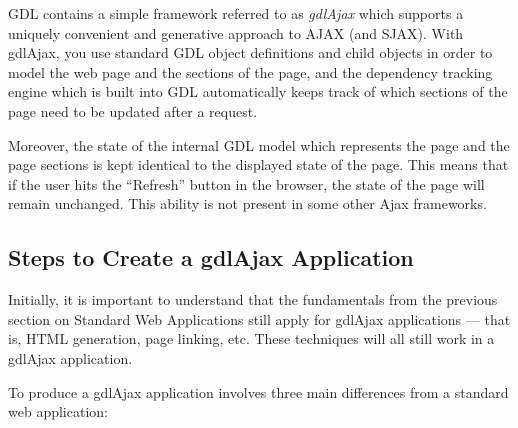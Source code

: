 \documentclass [11pt]{book}
\begin{document}
GDL contains a simple framework referred to as \emph{gdlAjax} which supports a uniquely convenient and generative
approach to AJAX (and SJAX). With gdlAjax, you use standard GDL
object definitions and child objects in order to model the web page
and the sections of the page, and the dependency tracking engine which
is built into GDL automatically keeps track of which sections of the
page need to be updated after a request.



Moreover, the state of the internal GDL model which
represents the page and the page sections is kept identical to the
displayed state of the page. This means that if the user hits the
``Refresh'' button in the browser, the state of the page will remain
unchanged. This ability is not present in some other Ajax
frameworks.



\subsection{Steps to Create a gdlAjax Application}

\label{subsec:stepstocreateagdlajaxapplication}



Initially, it is important to understand that the
fundamentals from the previous section on Standard Web Applications
still apply for gdlAjax applications --- that is, HTML generation,
page linking, etc. These techniques will all still work in a gdlAjax
application.



To produce a gdlAjax application involves three main differences from
a standard web application:
\end{document}
